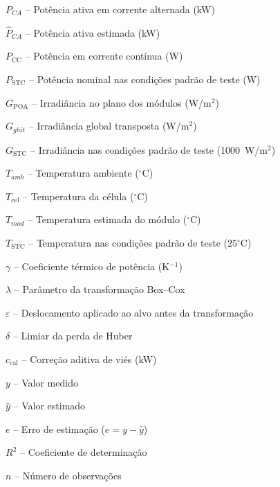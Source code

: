 
\begingroup
\SingleSpacing
\begin{flushleft}
$P_{CA}$ -- Potência ativa em corrente alternada (kW)\par
$\hat{P}_{CA}$ -- Potência ativa estimada (kW)\par
$P_{\mathrm{CC}}$ -- Potência em corrente contínua (W)\par
$P_{\mathrm{STC}}$ -- Potência nominal nas condições padrão de teste (W)\par
$G_{\mathrm{POA}}$ -- Irradiância no plano dos módulos (W/m$^2$)\par
$G_{ghit}$ -- Irradiância global transposta (W/m$^2$)\par
$G_{\mathrm{STC}}$ -- Irradiância nas condições padrão de teste (1000~W/m$^2$)\par
$T_{amb}$ -- Temperatura ambiente ($^\circ$C)\par
$T_{\mathrm{cel}}$ -- Temperatura da célula ($^\circ$C)\par
$T_{mod}$ -- Temperatura estimada do módulo ($^\circ$C)\par
$T_{\mathrm{STC}}$ -- Temperatura nas condições padrão de teste ($25^\circ$C)\par
$\gamma$ -- Coeficiente térmico de potência (K$^{-1}$)\par
$\lambda$ -- Parâmetro da transformação Box--Cox\par
$\varepsilon$ -- Deslocamento aplicado ao alvo antes da transformação\par
$\delta$ -- Limiar da perda de Huber\par
$c_{\mathrm{cal}}$ -- Correção aditiva de viés (kW)\par
$y$ -- Valor medido\par
$\hat{y}$ -- Valor estimado\par
$e$ -- Erro de estimação ($e=y-\hat{y}$)\par
$R^2$ -- Coeficiente de determinação\par
$n$ -- Número de observações\par
\end{flushleft}
\endgroup
